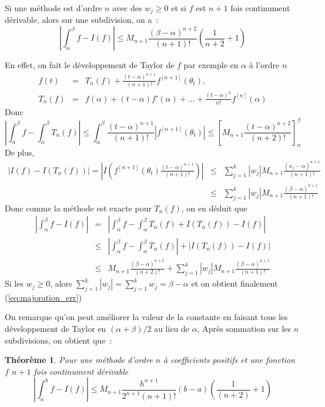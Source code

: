 \documentclass[a4paper,11pt]{article}
\newtheorem{thm}{Théorème}
\begin{document}
\begin{giacjshere}
Si une méthode est d'ordre $n$ avec des $w_j\geq 0$ et 
si $f$ est $n+1$ fois continument dérivable,
alors sur une subdivision, on a~:
\begin{equation} \label{eq:majoration_err}
|\int_{\alpha}^{\beta} f-I(f)| \leq M_{n+1} \frac{(\beta-\alpha)^{n+2}}{(n+1)!}
(\frac{1}{n+2}+1)
\end{equation}

En effet, on fait le développement de Taylor de $f$ par exemple
en $\alpha$ à l'ordre $n$
\begin{eqnarray*}
 f(t)&=&T_{n}(f)+\frac{(t-\alpha)^{n+1}}{(n+1)!} f^{[n+1]}(\theta_t),\\
 T_{n}(f)&=&f(\alpha)+(t-\alpha)f'(\alpha)+...+ 
\frac{(t-\alpha)^{n}}{n!} f^{[n]}(\alpha)
\end{eqnarray*}
Donc 
\[ |\int_{\alpha}^{\beta} f- \int_{\alpha}^{\beta} T_{n}(f)|
\leq \int_{\alpha}^{\beta} \frac{(t-\alpha)^{n+1}}{(n+1)!} |f^{[n+1]}(\theta_t)| 
\leq \left[ M_{n+1} \frac{(t-\alpha)^{n+2}}{(n+2)!} \right]_\alpha^\beta
\]
De plus, 
\begin{eqnarray*}
 |I(f) -I(T_n(f))| =|I\left( f^{[n+1]}(\theta_t)
  \frac{(t-\alpha)^{n+1}}{(n+1)!} \right)|
& \leq &  \sum_{j=1}^k |w_j| M_{n+1} \frac{(x_j-\alpha)^{n+1}}{(n+1)!} 
\\
& \leq & \sum_{j=1}^k |w_j| M_{n+1} \frac{(\beta-\alpha)^{n+1}}{(n+1)!}
\end{eqnarray*}
Donc comme la méthode est exacte pour $T_n(f)$, on en déduit que
\begin{eqnarray*}
|\int_{\alpha}^{\beta} f-I(f)|
&= &|\int_{\alpha}^{\beta} f-\int_{\alpha}^{\beta} T_n(f)+I(T_n(f))- I(f)| \\
&\leq& |\int_{\alpha}^{\beta} f-\int_{\alpha}^{\beta} T_n(f)|+|I(T_n(f))- I(f)|\\
&\leq & M_{n+1}  \frac{(\beta-\alpha)^{n+2}}{(n+2)!} +  
\sum_{j=1}^k |w_j| M_{n+1} \frac{(\beta-\alpha)^{n+1}}{(n+1)!} 
\end{eqnarray*}
Si les $w_j\geq 0$, alors $\sum_{j=1}^k |w_j|=\sum_{j=1}^k w_j=\beta-\alpha$
et on obtient finalement (\ref{eq:majoration_err})

On remarque qu'on peut am\'eliorer la valeur de la constante 
en faisant tous les d\'eveloppement de Taylor
en $(\alpha+\beta)/2$ au lieu de $\alpha$, 
Après sommation sur les $n$ subdivisions, on obtient que~:
\begin{thm}
Pour une méthode d'ordre $n$ à coefficients positifs et une fonction $f$
$n+1$ fois continument d\'erivable~
\[|\int_{a}^{b} f-I(f)| \leq M_{n+1} \frac{h^{n+1}}{2^{n+1}(n+1)!}  (b-a) 
(\frac{1}{(n+2)}+1)\]
\end{thm}


\end{giacjshere}
\end{document}
